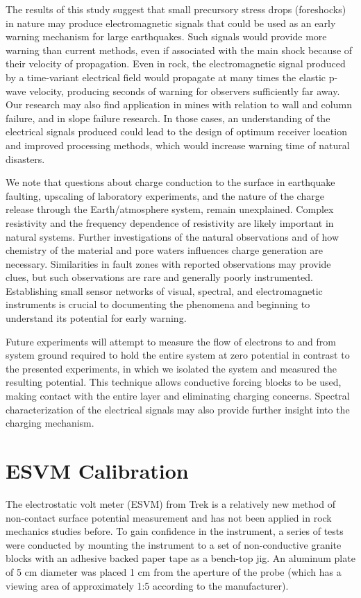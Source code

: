 The results of this study suggest that small precursory stress drops (foreshocks) in nature may produce electromagnetic signals that could be used as an early warning mechanism for large earthquakes.  Such signals would provide more warning than current methods, even if associated with the main shock because of their velocity of propagation.  Even in rock, the electromagnetic signal produced by a time-variant electrical field would propagate at many times the elastic p-wave velocity, producing seconds of warning for observers sufficiently far away.  Our research may also find application  in mines with relation to wall and column failure, and in slope failure research.  In those cases, an understanding of the electrical signals produced could lead to the design of optimum receiver location and improved processing methods, which  would increase warning time of natural disasters.

We note that questions about charge conduction to the surface in earthquake faulting, upscaling of laboratory experiments, and the nature of the charge release through the Earth/atmosphere system, remain unexplained.  Complex resistivity and the frequency dependence of resistivity are likely important in natural systems.  Further investigations of the natural observations and of how chemistry of the material and pore waters influences charge generation are necessary.  Similarities in fault zones with reported observations may provide clues, but such observations are rare and generally poorly instrumented.  Establishing small sensor networks of visual, spectral, and electromagnetic instruments is crucial to documenting the phenomena and beginning to understand its potential for early warning.     

Future experiments will attempt to measure the flow of electrons to and from system ground required to hold the entire system at zero potential in contrast to the presented experiments, in which we isolated the system and measured the resulting potential.  This technique allows conductive forcing blocks to be used, making contact with the entire layer and eliminating charging concerns.  Spectral characterization of the electrical signals may also provide further insight into the charging mechanism.

\section{ESVM Calibration}

The electrostatic volt meter (ESVM) from Trek is a relatively new method of non-contact surface potential measurement and has not been applied in rock mechanics studies before.  To gain confidence in the instrument, a series of tests were conducted by mounting the instrument to a set of non-conductive granite blocks with an adhesive backed paper tape as a bench-top jig.  An aluminum plate of 5 cm diameter was placed 1 cm from the aperture of the probe (which has a viewing area of approximately 1:5 according to the manufacturer).  

